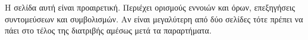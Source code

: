 \chapter*{\csesymvolismoi}

Η σελίδα αυτή είναι προαιρετική. Περιέχει ορισμούς εννοιών και
όρων, επεξηγήσεις συντομεύσεων και συμβολισμών. Αν είναι
μεγαλύτερη από δύο σελίδες τότε πρέπει να πάει στο τέλος της
διατριβής αμέσως μετά τα παραρτήματα.

